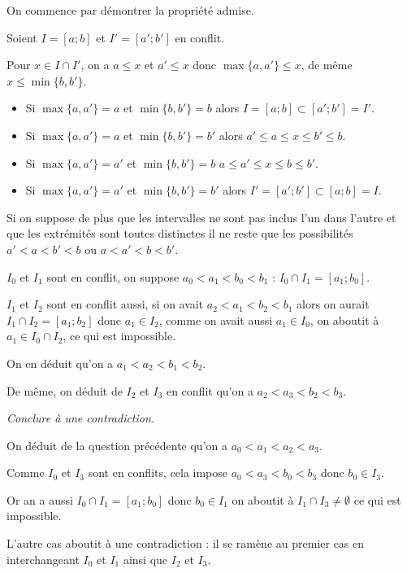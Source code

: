 \begin{Answer}

On commence par démontrer la propriété admise.

Soient $I=[a;b]$ et $I'=[a';b']$ en conflit.

Pour $x\in I\cap I'$, on a $a\le x$ et $a'\le x$ donc $\max\{a, a'\}\le x$, de même $x\le \min\{b, b'\}$.

\begin{itemize}
    \item Si $\max\{a, a'\} = a$ et $\min\{b, b'\}=b$ alors $I=[a;b]\subset [a';b']=I'$.
    \item Si $\max\{a, a'\} = a$ et $\min\{b, b'\}=b'$ alors $a'\le a\le x\le b'\le b$.
    \item Si $\max\{a, a'\} = a'$ et $\min\{b, b'\}=b$  $a\le a'\le x\le b\le b'$.
    \item Si $\max\{a, a'\} = a'$ et $\min\{b, b'\}=b'$ alors $I'=[a';b']\subset [a;b]=I$.
\end{itemize}

Si on suppose de plus que les intervalles ne sont pas inclus l'un dans l'autre et que les extrémités sont toutes distinctes il ne reste que les possibilités
$a' < a < b' < b$ ou $a < a' < b < b'$.

\medskip

$I_0$ et $I_1$ sont en conflit, on suppose $a_0 < a_1 < b_0 < b_1$ : $I_0\cap I_1=[a_1; b_0]$.

$I_1$ et $I_2$ sont en conflit aussi, si on avait $a_2 < a_1 < b_2 < b_1$ alors on aurait $I_1\cap I_2=[a_1;b_2]$ donc $a_1\in I_2$, comme on avait aussi $a_1\in I_0$, on aboutit à $a_1\in I_0\cap I_2$, ce qui est impossible. 

On en déduit qu'on a $a_1< a_2< b_1< b_2$.

De même, on déduit de $I_2$ et $I_3$ en conflit qu'on a $a_2<a_3<b_2<b_3$.
\end{Answer}
\begin{Exercise}\it
Conclure à une contradiction.
\end{Exercise}  
\begin{Answer}
On déduit de la question précédente qu'on a $a_0<a_1<a_2<a_3$.

Comme $I_0$ et $I_3$ sont en conflits, cela impose $a_0<a_3<b_0<b_3$ donc $b_0\in I_3$.

Or an a aussi $I_0\cap I_1=[a_1; b_0]$ donc $b_0\in I_1$ on aboutit à $I_1\cap I_3\ne \emptyset$ ce qui est impossible.

\medskip

L'autre cas aboutit à une contradiction : il se ramène au premier cas en interchangeant $I_0$ et $I_1$ ainsi que $I_2$ et $I_3$.
\end{Answer}
